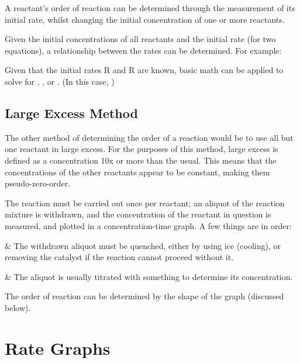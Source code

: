 			A reactant’s order of reaction can be determined through the measurement of its initial rate, whilst changing the initial
			concentration of one or more reactants.

			Given the initial concentrations of all reactants and the initial rate (for two equations), a relationship between the rates can be
			determined. For example:


			Given that the initial rates R and R are known, basic math can be applied to solve for , ,
			or . (In this case, )


		\subsection{Large Excess Method}

			The other method of determining the order of a reaction would be to use all but one reactant in large excess. For the purposes of this
			method, large excess is defined as a concentration 10x or more than the usual. This means that the concentrations of the other
			reactants appear to be constant, making them pseudo-zero-order.

			The reaction must be carried out once per reactant; an aliquot of the reaction mixture is withdrawn, and the concentration of the
			reactant in question is measured, and plotted in a concentration-time graph. A few things are in order:

			\begin{bulletlist}
				&	The withdrawn aliquot must be quenched, either by using ice (cooling), or removing the catalyst if the reaction cannot proceed
					without it.

				&	The aliquot is usually titrated with something to determine its concentration.
			\end{bulletlist}

			The order of reaction can be determined by the shape of the graph (discussed below).







	\pagebreak
	\section{Rate Graphs}

